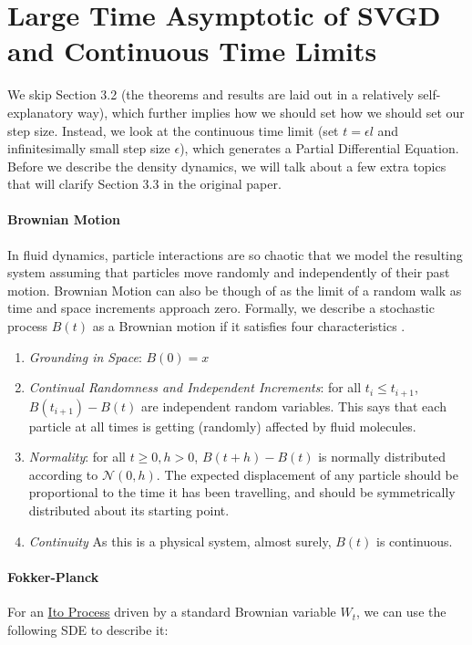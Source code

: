 \documentclass[12pt]{article}
\begin{document}
\section{Large Time Asymptotic of SVGD and Continuous Time Limits}

\noindent We skip Section 3.2 (the theorems and results are laid out in a relatively self-explanatory way), which further implies how we should set how we should set our step size. Instead, we look at the continuous time limit (set $t = \epsilon l$ and infinitesimally small step size $\epsilon$), which generates a Partial Differential Equation. Before we describe the density dynamics, we will talk about a few extra topics that will clarify Section 3.3 in the original paper.

\paragraph{Brownian Motion} In fluid dynamics, particle interactions are so chaotic that we model the resulting system assuming that particles move randomly and independently of their past motion. Brownian Motion can also be though of as the limit of a random walk as time and space increments approach zero. Formally, we describe a stochastic process $B(t)$ as a Brownian motion if it satisfies four characteristics \cite{introbrownian}.

\begin{enumerate}
    \item \textit{Grounding in Space}: $B(0) = x$
    \item \textit{Continual Randomness and Independent Increments}: for all $t_i \leq t_{i + 1}$, $B(t_{i+1}) - B(t)$ are independent random variables. This says that each particle at all times is getting (randomly) affected by fluid molecules.
    \item \textit{Normality}: for all $t \geq 0, h > 0$, $B(t+h) - B(t)$ is normally distributed according to $\mathcal{N}(0, h)$. The expected displacement of any particle should be proportional to the time it has been travelling, and should be symmetrically distributed about its starting point. 
    \item \textit{Continuity} As this is a physical system, almost surely, $B(t)$ is continuous.
\end{enumerate}

\paragraph{Fokker-Planck} For an \href{https://en.wikipedia.org/wiki/It\%C3\%B4_calculus#Integration_with_respect_to_Brownian_motion}{Ito Process} driven by a standard Brownian variable $W_t$, we can use the following SDE to describe it: 
\end{document}
